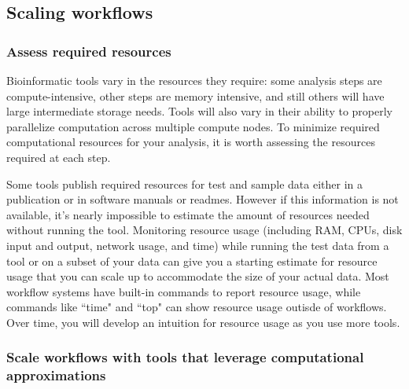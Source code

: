 \documentclass[10pt,letterpaper]{article}
\begin{document}
\subsection*{Scaling workflows} %

\subsubsection*{Assess required resources}

Bioinformatic tools vary in the resources they require: some analysis steps are compute-intensive, other steps are memory intensive, and still others will have large intermediate storage needs. 
Tools will also vary in their ability to properly parallelize computation across multiple compute nodes. 
To minimize required computational resources for your analysis, it is worth assessing the resources required at each step.

Some tools publish required resources for test and sample data either in a publication or in software manuals or readmes. 
However if this information is not available, it's nearly impossible to estimate the amount of resources needed without running the tool. 
Monitoring resource usage (including RAM, CPUs, disk input and output, network usage, and time) while running the test data from a tool or on a subset of your data can give you a starting estimate for resource usage that you can scale up to accommodate the size of your actual data. 
Most workflow systems have built-in commands to report resource usage, while commands like ``time" and ``top" can show resource usage outisde of workflows.
Over time, you will develop an intuition for resource usage as you use more tools.

\subsubsection*{Scale workflows with tools that leverage computational approximations}
 
\end{document}
